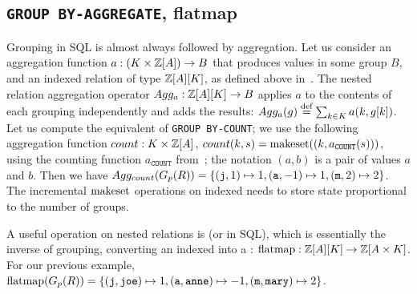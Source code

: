 \subsection{\texttt{GROUP BY-AGGREGATE}, flatmap}

Grouping in SQL is almost always followed by aggregation.
Let us consider an aggregation function $a: (K \times \mathbb{Z}[A]) \to B$ that produces values
in some group $B$, and an indexed relation of type $\mathbb{Z}[A][K]$, as defined above in~.
The nested relation aggregation operator $Agg_a: \mathbb{Z}[A][K] \to B$ applies $a$
to the contents of each grouping independently and adds the results:
$Agg_a(g) \stackrel{\textrm{\scriptsize def}}{=} \sum_{k \in K} a(k, g[k])$.  Let us compute the equivalent of \texttt{GROUP BY-COUNT}; we use
the following aggregation function $count: K \times \mathbb{Z}[A]$, $count(k, s) =
\mbox{makeset}((k, a_\texttt{COUNT}(s)))$, using the \zr counting function $a_\texttt{COUNT}$
from~; the notation $(a,b)$ is a pair of values $a$ and $b$.
Then we have $Agg_{count} (G_p(R)) = \{ (\mbox{\texttt{j}}, 1) \mapsto 1,
(\mbox{\texttt{a}}, -1) \mapsto 1, (\mbox{\texttt{m}}, 2) \mapsto 2 \}$.
The incremental $\mbox{makeset}$ operations on indexed \zrs needs to store state
proportional to the number of groups.


A useful operation on nested relations is  (or  in SQL), which is
essentially the inverse of grouping, converting an indexed
\zr into a \zr: $\mbox{flatmap}: \mathbb{Z}[A][K] \to \mathbb{Z}[A \times K]$.
For our previous example, $\mbox{flatmap}(G_p(R)) = \{ (\mbox{\texttt{j}}, \mbox{\texttt{joe}}) \mapsto 1,
(\mbox{\texttt{a}}, \mbox{\texttt{anne}}) \mapsto -1, (\mbox{\texttt{m}}, \mbox{\texttt{mary}}) \mapsto 2 \}$.



